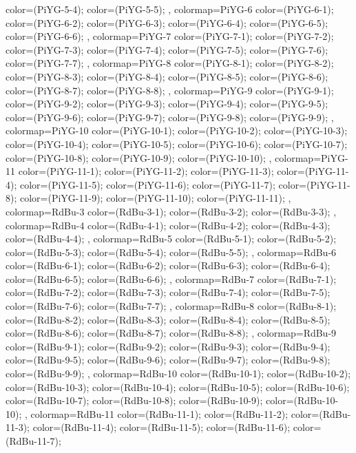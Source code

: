 {{  color=(PiYG-5-4);
  color=(PiYG-5-5);
},
colormap={PiYG-6}{
  color=(PiYG-6-1);
  color=(PiYG-6-2);
  color=(PiYG-6-3);
  color=(PiYG-6-4);
  color=(PiYG-6-5);
  color=(PiYG-6-6);
},
colormap={PiYG-7}{
  color=(PiYG-7-1);
  color=(PiYG-7-2);
  color=(PiYG-7-3);
  color=(PiYG-7-4);
  color=(PiYG-7-5);
  color=(PiYG-7-6);
  color=(PiYG-7-7);
},
colormap={PiYG-8}{
  color=(PiYG-8-1);
  color=(PiYG-8-2);
  color=(PiYG-8-3);
  color=(PiYG-8-4);
  color=(PiYG-8-5);
  color=(PiYG-8-6);
  color=(PiYG-8-7);
  color=(PiYG-8-8);
},
colormap={PiYG-9}{
  color=(PiYG-9-1);
  color=(PiYG-9-2);
  color=(PiYG-9-3);
  color=(PiYG-9-4);
  color=(PiYG-9-5);
  color=(PiYG-9-6);
  color=(PiYG-9-7);
  color=(PiYG-9-8);
  color=(PiYG-9-9);
},
colormap={PiYG-10}{
  color=(PiYG-10-1);
  color=(PiYG-10-2);
  color=(PiYG-10-3);
  color=(PiYG-10-4);
  color=(PiYG-10-5);
  color=(PiYG-10-6);
  color=(PiYG-10-7);
  color=(PiYG-10-8);
  color=(PiYG-10-9);
  color=(PiYG-10-10);
},
colormap={PiYG-11}{
  color=(PiYG-11-1);
  color=(PiYG-11-2);
  color=(PiYG-11-3);
  color=(PiYG-11-4);
  color=(PiYG-11-5);
  color=(PiYG-11-6);
  color=(PiYG-11-7);
  color=(PiYG-11-8);
  color=(PiYG-11-9);
  color=(PiYG-11-10);
  color=(PiYG-11-11);
},
colormap={RdBu-3}{
  color=(RdBu-3-1);
  color=(RdBu-3-2);
  color=(RdBu-3-3);
},
colormap={RdBu-4}{
  color=(RdBu-4-1);
  color=(RdBu-4-2);
  color=(RdBu-4-3);
  color=(RdBu-4-4);
},
colormap={RdBu-5}{
  color=(RdBu-5-1);
  color=(RdBu-5-2);
  color=(RdBu-5-3);
  color=(RdBu-5-4);
  color=(RdBu-5-5);
},
colormap={RdBu-6}{
  color=(RdBu-6-1);
  color=(RdBu-6-2);
  color=(RdBu-6-3);
  color=(RdBu-6-4);
  color=(RdBu-6-5);
  color=(RdBu-6-6);
},
colormap={RdBu-7}{
  color=(RdBu-7-1);
  color=(RdBu-7-2);
  color=(RdBu-7-3);
  color=(RdBu-7-4);
  color=(RdBu-7-5);
  color=(RdBu-7-6);
  color=(RdBu-7-7);
},
colormap={RdBu-8}{
  color=(RdBu-8-1);
  color=(RdBu-8-2);
  color=(RdBu-8-3);
  color=(RdBu-8-4);
  color=(RdBu-8-5);
  color=(RdBu-8-6);
  color=(RdBu-8-7);
  color=(RdBu-8-8);
},
colormap={RdBu-9}{
  color=(RdBu-9-1);
  color=(RdBu-9-2);
  color=(RdBu-9-3);
  color=(RdBu-9-4);
  color=(RdBu-9-5);
  color=(RdBu-9-6);
  color=(RdBu-9-7);
  color=(RdBu-9-8);
  color=(RdBu-9-9);
},
colormap={RdBu-10}{
  color=(RdBu-10-1);
  color=(RdBu-10-2);
  color=(RdBu-10-3);
  color=(RdBu-10-4);
  color=(RdBu-10-5);
  color=(RdBu-10-6);
  color=(RdBu-10-7);
  color=(RdBu-10-8);
  color=(RdBu-10-9);
  color=(RdBu-10-10);
},
colormap={RdBu-11}{
  color=(RdBu-11-1);
  color=(RdBu-11-2);
  color=(RdBu-11-3);
  color=(RdBu-11-4);
  color=(RdBu-11-5);
  color=(RdBu-11-6);
  color=(RdBu-11-7);
}}
